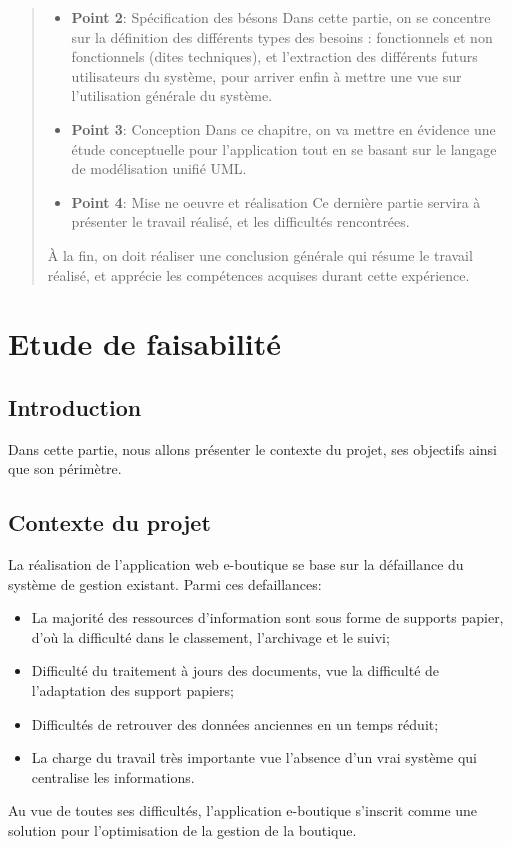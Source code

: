 \documentclass[a4paper,11pt]{article}
\begin{document}
\begin{abstract}
\begin{itemize}
  \item \textbf{Point 2}: Spécification des bésons
  \newline Dans cette partie, on se concentre sur la définition des différents types des besoins : fonctionnels et non fonctionnels (dites techniques), et l’extraction des différents futurs utilisateurs du système, pour arriver enfin à mettre une vue sur l’utilisation générale du système.
  \item \textbf{Point 3}: Conception
  \newline Dans ce chapitre, on va mettre en évidence une étude conceptuelle pour l’application tout en se basant sur le langage de modélisation unifié UML.
  \item \textbf{Point 4}: Mise ne oeuvre et réalisation
  \newline Ce dernière partie servira à présenter le travail réalisé, et les difficultés rencontrées.
 \end{itemize} 
 
 À la fin, on doit réaliser une conclusion générale qui résume le travail réalisé, et apprécie les
compétences acquises durant cette expérience.

\end{abstract}

\newpage
{}
\section{Etude de faisabilité}
\subsection*{Introduction}
  Dans cette partie, nous allons présenter le contexte du projet, ses objectifs ainsi que son périmètre.
\subsection{Contexte du projet}
La réalisation de l'application web e-boutique se base sur la défaillance du système de gestion existant.
\newline Parmi ces defaillances: 
\begin{itemize}
  \item La majorité des ressources d'information sont sous forme de supports papier, d'où la difficulté dans le classement, l'archivage et le suivi;
  \item Difficulté du traitement à jours des documents, vue la difficulté de l’adaptation des support papiers;
  \item Difficultés de retrouver des données anciennes en un temps réduit;
  \item La charge du travail très importante vue l’absence d’un vrai système qui centralise les informations.
 \end{itemize} 
Au vue de toutes ses difficultés, l'application e-boutique s'inscrit comme une solution pour l'optimisation de la gestion de la boutique.
\end{document}
